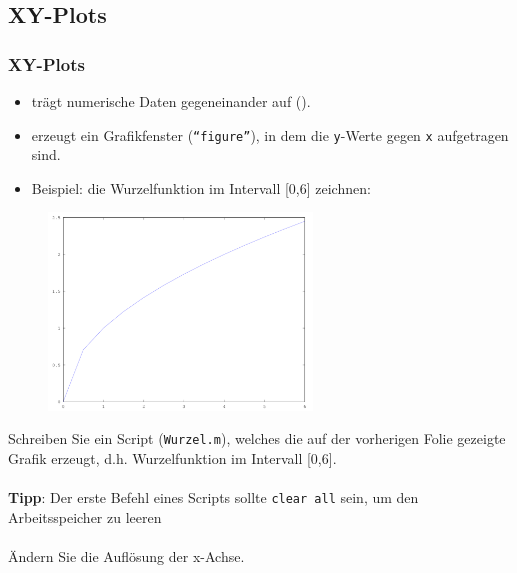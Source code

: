       \subsection{XY-Plots}
      \begin{frame}
          \frametitle{XY-Plots}

          \vspace{-0.5cm}

          \begin{itemize}
              \item {} trägt numerische Daten gegeneinander auf ().
              \item {} erzeugt ein Grafikfenster (\texttt{``figure''}), in dem die \texttt{y}-Werte gegen \texttt{x} aufgetragen sind.
              \item Beispiel: die Wurzelfunktion im Intervall [0,6] zeichnen:
          \end{itemize}

          \vspace{-0.3cm}

          \begin{figure}
              \includegraphics[width=7.0cm]{example2_1.png}
          \end{figure}
      \end{frame}

      \secMexercise
      \begin{frame}
          \frameMexercise
          \begin{exercise}
              \sloppy
              Schreiben Sie ein Script (\texttt{Wurzel.m}), welches die auf der vorherigen Folie gezeigte Grafik erzeugt, d.h. Wurzelfunktion im Intervall [0,6].\\ \\

              \textbf{Tipp}: Der erste Befehl eines Scripts sollte \texttt{clear all} sein, um den Arbeitsspeicher zu leeren\\ \\

              Ändern Sie die Auflösung der x-Achse.
          \end{exercise}
      \end{frame}


